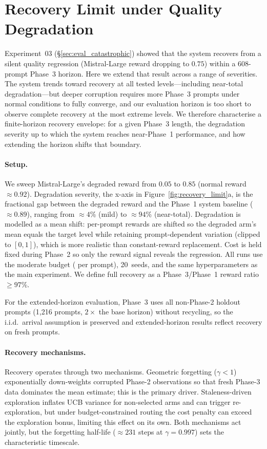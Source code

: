\section{Recovery Limit under Quality Degradation}
\label{appendix:recovery_limit}

Experiment~03 (\S\ref{sec:eval_catastrophic}) showed that the system
recovers from a silent quality regression (Mistral-Large reward
dropping to $0.75$) within a 608-prompt Phase~3 horizon.  Here we
extend that result across a range of severities.  The system trends
toward recovery at all tested levels---including near-total
degradation---but deeper corruption requires more Phase~3 prompts
under normal conditions to fully converge, and our evaluation horizon
is too short to observe complete recovery at the most extreme levels.
We therefore characterise a finite-horizon recovery envelope: for a
given Phase~3 length, the degradation severity up to which the system
reaches near-Phase~1 performance, and how extending the horizon shifts
that boundary.

\vspace{-0.5ex}
\paragraph{Setup.}
We sweep Mistral-Large's degraded reward from $0.05$ to $0.85$
(normal reward ${\approx}0.92$).  Degradation severity, the x-axis in
Figure~\ref{fig:recovery_limit}a, is the fractional gap between the
degraded reward and the Phase~1 system baseline (${\approx}0.89$),
ranging from ${\approx}4$\% (mild) to ${\approx}94$\% (near-total).
Degradation is modelled as a mean shift: per-prompt rewards are
shifted so the degraded arm's mean equals the target level while
retaining prompt-dependent variation (clipped to $[0,1]$), which is
more realistic than constant-reward replacement.  Cost is held fixed
during Phase~2 so only the reward signal reveals the regression.  All
runs use the moderate budget
(\rlBudgetTarget{} per prompt), 20~seeds,
and the same hyperparameters as the main experiment.  We define full
recovery as a Phase~3/Phase~1 reward ratio ${\geq}97$\%.

For the extended-horizon evaluation, Phase~3 uses all non-Phase-2
holdout prompts (1{,}216 prompts, $2{\times}$ the base horizon)
without recycling, so the i.i.d.\ arrival assumption is preserved and
extended-horizon results reflect recovery on fresh prompts.

\paragraph{Recovery mechanisms.}
Recovery operates through two mechanisms.  Geometric forgetting
($\gamma{<}1$) exponentially down-weights corrupted Phase-2
observations so that fresh Phase-3 data dominates the mean estimate;
this is the primary driver.  Staleness-driven exploration inflates UCB
variance for non-selected arms and can trigger re-exploration, but
under budget-constrained routing the cost penalty can exceed the
exploration bonus, limiting this effect on its own.  Both mechanisms
act jointly, but the forgetting half-life (${\approx}231$ steps at
$\gamma{=}0.997$) sets the characteristic timescale.

